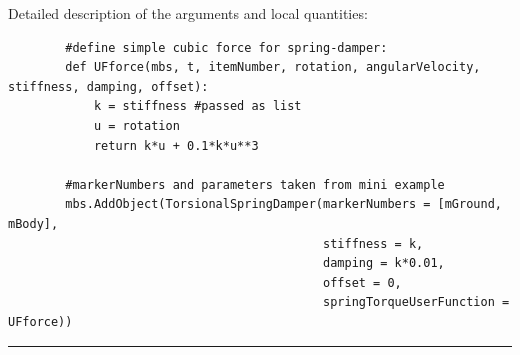     Detailed description of the arguments and local quantities:
    \finishTable
    \userFunctionExample{}
    \pythonstyle\begin{lstlisting}
        #define simple cubic force for spring-damper:
        def UFforce(mbs, t, itemNumber, rotation, angularVelocity, stiffness, damping, offset): 
            k = stiffness #passed as list
            u = rotation
            return k*u + 0.1*k*u**3
        
        #markerNumbers and parameters taken from mini example
        mbs.AddObject(TorsionalSpringDamper(markerNumbers = [mGround, mBody], 
                                            stiffness = k, 
                                            damping = k*0.01, 
                                            offset = 0,
                                            springTorqueUserFunction = UFforce))
    \end{lstlisting}
\vspace{6pt}\par\noindent\rule{\textwidth}{0.4pt}
\label{miniExample_ObjectConnectorTorsionalSpringDamper}
\pythonstyle
